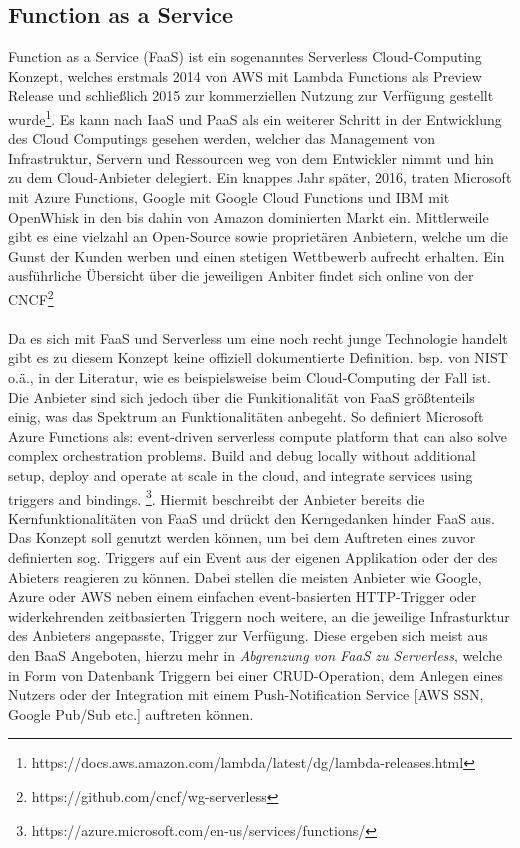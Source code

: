 \documentclass[11pt]{article}
\begin{document}
\subsection{Function as a Service}
Function as a Service (FaaS) ist ein sogenanntes \glqq Serverless\grqq{} Cloud-Computing Konzept, welches erstmals 2014 von AWS mit Lambda Functions als Preview Release und schließlich 2015 zur kommerziellen Nutzung zur Verfügung gestellt wurde\footnote{https://docs.aws.amazon.com/lambda/latest/dg/lambda-releases.html}. Es kann nach IaaS und PaaS als ein weiterer Schritt in der Entwicklung des Cloud Computings gesehen werden, welcher das Management von Infrastruktur, Servern und Ressourcen weg von dem Entwickler nimmt und hin zu dem Cloud-Anbieter delegiert. Ein knappes Jahr später, 2016, traten Microsoft mit Azure Functions, Google mit Google Cloud Functions und IBM mit OpenWhisk in den bis dahin von Amazon dominierten Markt ein. Mittlerweile gibt es eine vielzahl an Open-Source sowie proprietären Anbietern, welche um die Gunst der Kunden werben und einen stetigen Wettbewerb aufrecht erhalten. Ein ausführliche Übersicht über die jeweiligen Anbiter findet sich online von der CNCF\footnote{https://github.com/cncf/wg-serverless}\\\\
Da es sich mit FaaS und Serverless um eine noch recht junge Technologie handelt gibt es zu diesem Konzept keine offiziell dokumentierte Definition. bsp. von NIST o.ä., in der Literatur, wie es beispielsweise beim Cloud-Computing \cite{mell2011nist} der Fall ist. Die Anbieter sind sich jedoch über die Funkitionalität von FaaS größtenteils einig, was das Spektrum an Funktionalitäten anbegeht. So definiert Microsoft Azure Functions als: \glqq [...] event-driven serverless compute platform that can also solve complex orchestration problems. Build and debug locally without additional setup, deploy and operate at scale in the cloud, and integrate services using triggers and bindings. \grqq{}\footnote{https://azure.microsoft.com/en-us/services/functions/}. Hiermit beschreibt der Anbieter bereits die Kernfunktionalitäten von FaaS und drückt den Kerngedanken hinder FaaS aus. Das Konzept soll genutzt werden können, um bei dem Auftreten eines zuvor definierten sog. Triggers auf ein Event aus der eigenen Applikation oder der des Abieters reagieren zu können. Dabei stellen die meisten Anbieter wie Google, Azure oder AWS neben einem einfachen event-basierten HTTP-Trigger oder widerkehrenden zeitbasierten Triggern noch weitere, an die jeweilige Infrasturktur des Anbieters angepasste, Trigger zur Verfügung. Diese ergeben sich meist aus den BaaS Angeboten, hierzu mehr in \textit{Abgrenzung von FaaS zu Serverless}, welche in Form von Datenbank Triggern bei einer CRUD-Operation, dem Anlegen eines Nutzers oder der Integration mit einem Push-Notification Service [AWS SSN, Google Pub/Sub etc.] auftreten können.\\
\end{document}

